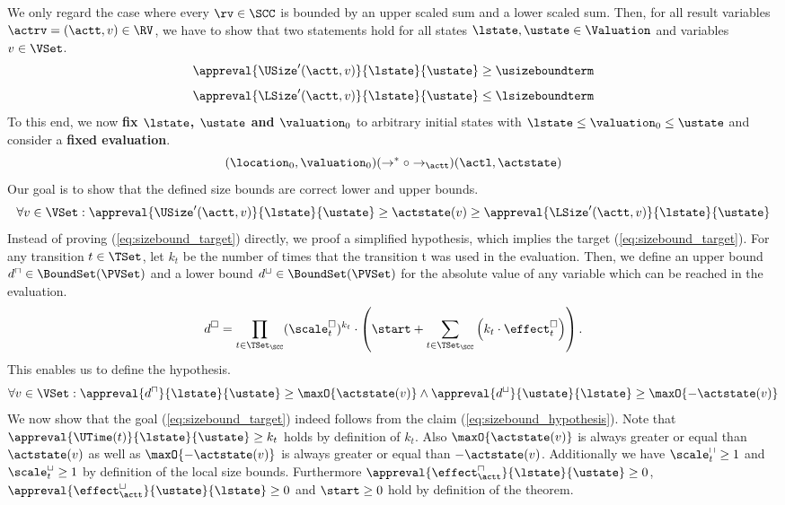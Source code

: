 We only regard the case where every $\rv \in \SCC$ is bounded by an upper scaled sum and a lower scaled sum.
Then, for all result variables $\actrv = (\actt, v) \in \RV$, we have to show that two statements hold for all states $\lstate, \ustate \in \Valuation$ and variables $v \in \VSet$.
\[ \appreval{\USize'(\actt, v)}{\lstate}{\ustate} \geq \usizeboundterm \]
\[ \appreval{\LSize'(\actt, v)}{\lstate}{\ustate} \leq \lsizeboundterm \]
To this end, we now \textbf{fix $\lstate$, $\ustate$ and $\valuation_0$} to arbitrary initial states with $\lstate \leq \valuation_0 \leq \ustate$ and consider a \textbf{fixed evaluation}.
\[ (\location_0, \valuation_0) (\rightarrow^* \circ \rightarrow_\actt) (\actl, \actstate) \]
Our goal is to show that the defined size bounds are correct lower and upper bounds.
\begin{equation} \label{eq:sizebound_target}
  \forall v \in \VSet: \appreval{\USize'(\actt, v)}{\lstate}{\ustate} \geq \actstate(v) \geq \appreval{\LSize'(\actt, v)}{\lstate}{\ustate}
\end{equation}
Instead of proving (\ref{eq:sizebound_target}) directly, we proof a simplified hypothesis, which implies the target (\ref{eq:sizebound_target}).
For any transition $t \in \TSet$, let $k_t$ be the number of times that the transition t was used in the evaluation.
Then, we define an upper bound $d^\sqcap \in \BoundSet(\PVSet)$ and a lower bound $d^\sqcup \in \BoundSet(\PVSet)$ for the absolute value of any variable which can be reached in the evaluation.
\[ d^\square = \prod_{t \in \TSet_\SCC} (\scale^\square_t)^{k_t} \cdot \left( \start + \sum_{t \in \TSet_\SCC} \left( k_t \cdot \effect^\square_t \right) \right). \]
This enables us to define the hypothesis.
\begin{equation} \label{eq:sizebound_hypothesis}
  \forall v \in \VSet: \appreval{d^\sqcap}{\lstate}{\ustate} \geq \maxO{\actstate(v)} \wedge \appreval{d^\sqcup}{\ustate}{\lstate} \geq \maxO{-\actstate(v)}
\end{equation}
We now show that the goal (\ref{eq:sizebound_target}) indeed follows from the claim (\ref{eq:sizebound_hypothesis}).
Note that $\appreval{\UTime(t)}{\lstate}{\ustate} \geq k_t$ holds by definition of $k_t$.
Also $\maxO{\actstate(v)}$ is always greater or equal than $\actstate(v)$ as well as $\maxO{-\actstate(v)}$ is always greater or equal than $-\actstate(v)$.
Additionally we have $\scale^\sqcap_t \geq 1$ and $\scale^\sqcup_t \geq 1$ by definition of the local size bounds.
Furthermore $\appreval{\effect^\sqcap_\actt}{\lstate}{\ustate} \geq 0$, $\appreval{\effect^\sqcup_\actt}{\ustate}{\lstate} \geq 0$ and $\start \geq 0$ hold by definition of the theorem.
